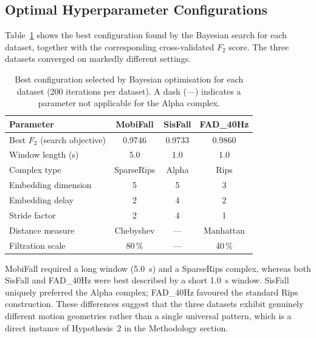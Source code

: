 \documentclass[onluarkali,ingilizce,yukseklisans,karton,LisansustuEgitim]{itutez}
\providecommand{\1}{\mathbf{1}}
\begin{document}
\subsection{Optimal Hyperparameter Configurations}
\label{subsubsec:optimal_params}

Table~\ref{tab:optimal_params} shows the best configuration found by the Bayesian search for each dataset, together with the corresponding cross-validated $F_2$ score. The three datasets converged on markedly different settings.

\begin{table}[h!]
\centering
\caption{Best configuration selected by Bayesian optimisation for each dataset
  (200 iterations per dataset).  A dash (---) indicates a parameter not
  applicable for the Alpha complex.}
\label{tab:optimal_params}
\small
\begin{tabular}{lccc}
\toprule
\textbf{Parameter} & \textbf{MobiFall} & \textbf{SisFall} & \textbf{FAD\_40Hz} \\
\midrule
Best $F_2$ (search objective) & 0.9746      & 0.9733   & 0.9860      \\
Window length (s)             & 5.0         & 1.0      & 1.0         \\
Complex type                  & SparseRips  & Alpha    & Rips        \\
Embedding dimension           & 5           & 5        & 3           \\
Embedding delay               & 2           & 4        & 2           \\
Stride factor                 & 2           & 4        & 1           \\
Distance measure              & Chebyshev   & ---      & Manhattan   \\
Filtration scale              & 80\,\%      & ---      & 40\,\%      \\
\bottomrule
\end{tabular}
\end{table}

MobiFall required a long window (5.0~s) and a SparseRips complex, whereas both SisFall and FAD\_40Hz were best described by a short 1.0~s window. SisFall uniquely preferred the Alpha complex; FAD\_40Hz favoured the standard Rips construction. These differences suggest that the three datasets exhibit genuinely different motion geometries rather than a single universal pattern, which is a direct instance of Hypothesis~2 in the Methodology section.
\end{document}
